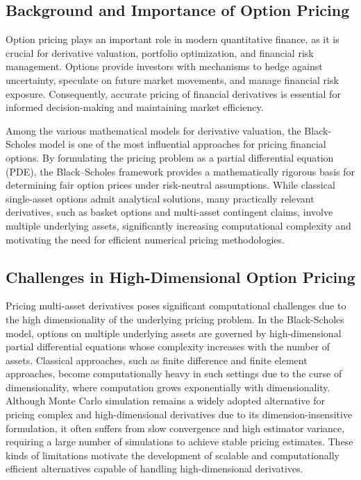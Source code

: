 \documentclass[12pt, a4paper]{article}
\begin{document}
\subsection{Background and Importance of Option Pricing}

Option pricing plays an important role in modern quantitative finance,
as it is crucial for derivative valuation, portfolio optimization, and
financial risk management. Options provide investors with mechanisms to
hedge against uncertainty, speculate on future market movements, and
manage financial risk exposure. Consequently, accurate pricing of
financial derivatives is essential for informed decision-making and
maintaining market efficiency.

Among the various mathematical models for derivative valuation, the
Black-Scholes model is one of the most influential approaches for
pricing financial options. By formulating the pricing problem as a
partial differential equation (PDE), the Black--Scholes framework
provides a mathematically rigorous basis for determining fair option
prices under risk-neutral assumptions. While classical single-asset
options admit analytical solutions, many practically relevant
derivatives, such as basket options and multi-asset contingent claims,
involve multiple underlying assets, significantly increasing
computational complexity and motivating the need for efficient
numerical pricing methodologies.

\subsection{Challenges in High-Dimensional Option Pricing}

Pricing multi-asset derivatives poses significant computational
challenges due to the high dimensionality of the underlying pricing
problem. In the Black-Scholes model, options on multiple underlying
assets are governed by high-dimensional partial differential equations
whose complexity increases with the number of assets. Classical
approaches, such as finite difference and finite element approaches,
become computationally heavy in such settings due to the curse of
dimensionality, where computation grows exponentially with
dimensionality. Although Monte Carlo simulation remains a widely
adopted alternative for pricing complex and high-dimensional
derivatives due to its dimension-insensitive formulation, it often
suffers from slow convergence and high estimator variance, requiring a
large number of simulations to achieve stable pricing estimates. These
kinds of limitations motivate the development of scalable and
computationally efficient alternatives capable of handling
high-dimensional derivatives.
\end{document}

